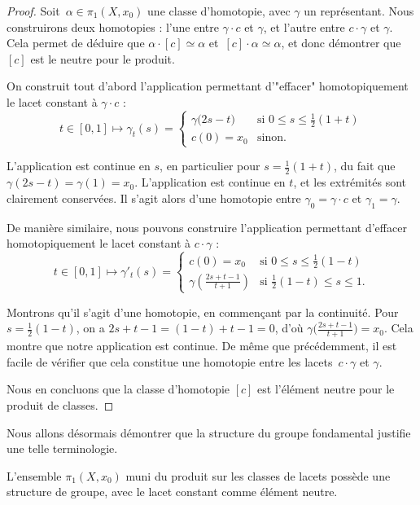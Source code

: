 \begin{proof}
Soit~${\alpha\in\pi_1(X,x_0)}$ une classe d'homotopie, avec $\gamma$ un représentant. Nous construirons deux homotopies : l'une entre $\gamma\cdot c$ et $\gamma$, et l'autre entre $c\cdot\gamma$ et $\gamma$. Cela permet de déduire que $\alpha\cdot [c]\simeq\alpha$ et~$[c]\cdot \alpha\simeq \alpha$, et donc démontrer que $[c]$ est le neutre pour le produit.

On construit tout d'abord l'application permettant d'"effacer" homotopiquement le lacet constant à $\gamma\cdot c$ : \[t\in[0,1]\mapsto\gamma_t(s)=\left\{\begin{matrix}
\gamma\big(2s-t\big)&\text{si }0\leq s\leq \frac{1}{2}(1+t)\\ 
c(0)=x_0&\text{sinon}.
\end{matrix}\right.\]

L'application est continue en $s$, en particulier pour $s=\frac{1}{2}(1+t)$, du fait que $\gamma(2s-t)=\gamma(1)=x_0$. L'application est continue en $t$, et les extrémités sont clairement conservées. Il s'agit alors d'une homotopie entre $\gamma_0=\gamma\cdot c$ et $\gamma_1=\gamma$.

De manière similaire, nous pouvons construire l'application permettant d'effacer homotopiquement le lacet constant à $c\cdot\gamma$ : \[t\in[0,1]\mapsto\gamma'_t(s)=\left\{\begin{matrix}
c\left(0\right)=x_0&\text{si }0\leq s\leq \frac{1}{2}(1-t)\\ 
\gamma\left(\frac{2s+t-1}{t+1}\right)&\text{si }\frac{1}{2}(1-t)\leq s\leq 1.
\end{matrix}\right.\]

Montrons qu'il s'agit d'une homotopie, en commençant par la continuité. Pour $s=\frac{1}{2}(1-t)$, on a ${2s+t-1=(1-t)+t-1=0}$, d'où $\gamma\big(\frac{2s+t-1}{t+1}\big)=x_0$. Cela montre que notre application est continue. De même que précédemment, il est facile de vérifier que cela constitue une homotopie entre les lacets~$c\cdot\gamma$ et $\gamma$.

Nous en concluons que la classe d'homotopie $[c]$ est l'élément neutre pour le produit de classes.
\end{proof}

Nous allons désormais démontrer que la structure du groupe fondamental justifie une telle terminologie.

\begin{theorem}
L'ensemble $\pi_1(X,x_0)$ muni du produit sur les classes de lacets possède une structure de groupe, avec le lacet constant comme élément neutre.
\end{theorem}

